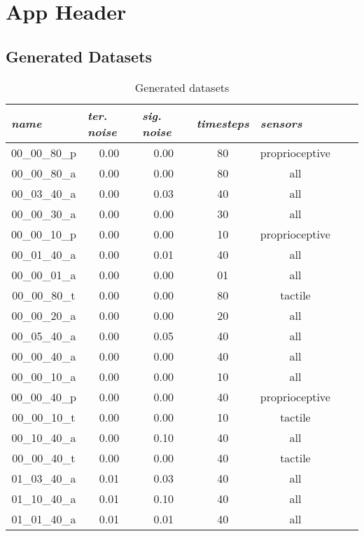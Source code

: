 \chapter{App Header} \label{app:detailed_results}

\section{Generated Datasets} \label{sec:generated_datasets}
\begin{table}[H]
\centering
\caption{Generated datasets}
\label{tab:generated_datasets}
\begin{tabular}{|c|c|c|c|c|c|c|}
\hline
\multicolumn{1}{|l|}{\textit{name}} & \multicolumn{1}{l|}{\textit{ter. noise}} & \multicolumn{1}{l|}{\textit{sig. noise}} & \multicolumn{1}{l|}{\textit{timesteps}} & \multicolumn{1}{l|}{\textit{sensors}} \\ \hline
00\_00\_80\_p	& 0.00	& 0.00	& 80	& proprioceptive	 \\ \hline
00\_00\_80\_a	& 0.00	& 0.00	& 80	& all	 \\ \hline
00\_03\_40\_a	& 0.00	& 0.03	& 40	& all	 \\ \hline
00\_00\_30\_a	& 0.00	& 0.00	& 30	& all	 \\ \hline
00\_00\_10\_p	& 0.00	& 0.00	& 10	& proprioceptive	 \\ \hline
00\_01\_40\_a	& 0.00	& 0.01	& 40	& all	 \\ \hline
00\_00\_01\_a	& 0.00	& 0.00	& 01	& all	 \\ \hline
00\_00\_80\_t	& 0.00	& 0.00	& 80	& tactile	 \\ \hline
00\_00\_20\_a	& 0.00	& 0.00	& 20	& all	 \\ \hline
00\_05\_40\_a	& 0.00	& 0.05	& 40	& all	 \\ \hline
00\_00\_40\_a	& 0.00	& 0.00	& 40	& all	 \\ \hline
00\_00\_10\_a	& 0.00	& 0.00	& 10	& all	 \\ \hline
00\_00\_40\_p	& 0.00	& 0.00	& 40	& proprioceptive	 \\ \hline
00\_00\_10\_t	& 0.00	& 0.00	& 10	& tactile	 \\ \hline
00\_10\_40\_a	& 0.00	& 0.10	& 40	& all	 \\ \hline
00\_00\_40\_t	& 0.00	& 0.00	& 40	& tactile	 \\ \hline
01\_03\_40\_a	& 0.01	& 0.03	& 40	& all	 \\ \hline
01\_10\_40\_a	& 0.01	& 0.10	& 40	& all	 \\ \hline
01\_01\_40\_a	& 0.01	& 0.01	& 40	& all	 \\ \hline

\end{tabular}
\end{table}
